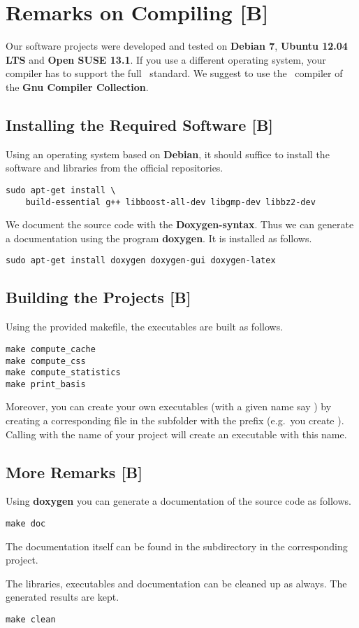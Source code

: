 \section{Remarks on Compiling [B]}
\label{program:compiling}

Our software projects were developed and tested on {\bf Debian 7}, {\bf Ubuntu 12.04 LTS} and {\bf Open SUSE 13.1}.
If you use a different operating system, your compiler has to support the full \cppeleven\ standard.
We suggest to use the \cpp\ compiler of the {\bf Gnu Compiler Collection}.

\subsection{Installing the Required Software [B]}
Using an operating system based on {\bf Debian}, it should suffice to install the software and libraries from the official repositories.
\begin{lstlisting}
sudo apt-get install \
    build-essential g++ libboost-all-dev libgmp-dev libbz2-dev
\end{lstlisting}
We document the source code with the {\bf Doxygen-syntax}.
Thus we can generate a documentation using the program {\bf doxygen}.
It is installed as follows.
\begin{lstlisting}
sudo apt-get install doxygen doxygen-gui doxygen-latex
\end{lstlisting}

\subsection{Building the Projects [B]}
Using the provided makefile, the executables are built as follows.
\begin{lstlisting}
make compute_cache
make compute_css
make compute_statistics
make print_basis
\end{lstlisting}
Moreover, you can create your own executables (with a given name say )
by creating a corresponding \progname{.cpp} file in the subfolder \progname{./kappa} with the prefix  (e.g.\ you create ).
Calling \progname{make} with the name of your project will create an executable with this name.

\subsection{More Remarks [B]}
Using {\bf doxygen} you can generate a documentation of the source code as follows. 
\begin{lstlisting}
make doc
\end{lstlisting}
The documentation itself can be found in the subdirectory  in the corresponding project.

The libraries, executables and documentation can be cleaned up as always.
The generated results are kept.
\begin{lstlisting}
make clean
\end{lstlisting}
